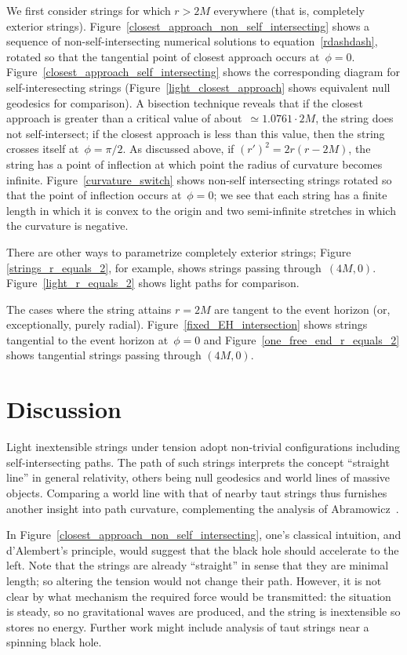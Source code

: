 We first consider strings for which $r>2M$ everywhere (that is,
completely exterior strings).
Figure~\ref{closest_approach_non_self_intersecting} shows a sequence
of non-self-intersecting numerical solutions to
equation~\ref{rdashdash}, rotated so that the tangential point of
closest approach occurs at~$\phi=0$.
Figure~\ref{closest_approach_self_intersecting} shows the
corresponding diagram for self-interesecting strings
(Figure~\ref{light_closest_approach} shows equivalent null geodesics
for comparison).  A bisection technique reveals that if the closest
approach is greater than a critical value of about~$\simeq 1.0761\cdot
2M$, the string does not self-intersect; if the closest approach is
less than this value, then the string crosses itself at~$\phi=\pi/2$.
As discussed above, if $\left(r'\right)^2=2r(r-2M)$, the string has a
point of inflection at which point the radius of curvature becomes
infinite.  Figure~\ref{curvature_switch} shows non-self intersecting
strings rotated so that the point of inflection occurs at~$\phi=0$; we
see that each string has a finite length in which it is convex to the
origin and two semi-infinite stretches in which the curvature is
negative.

There are other ways to parametrize completely exterior strings;
Figure \ref{strings_r_equals_2}, for example, shows strings passing
through~$(4M,0)$.  Figure~\ref{light_r_equals_2} shows light paths for
comparison.

The cases where the string attains $r=2M$ are tangent to the event
horizon (or, exceptionally, purely radial).
Figure~\ref{fixed_EH_intersection} shows strings tangential to the
event horizon at~$\phi=0$ and Figure~\ref{one_free_end_r_equals_2}
shows tangential strings passing through $(4M,0)$.

\section{Discussion}

Light inextensible strings under tension adopt non-trivial
configurations including self-intersecting paths.  The path of such
strings interprets the concept ``straight line'' in general
relativity, others being null geodesics and world lines of massive
objects.  Comparing a world line with that of nearby taut strings thus
furnishes another insight into path curvature, complementing the
analysis of Abramowicz~\cite{abramowicz1992}.

In Figure~\ref{closest_approach_non_self_intersecting}, one's
classical intuition, and d'Alembert's principle, would suggest that
the black hole should accelerate to the left.  Note that the strings
are already ``straight'' in sense that they are minimal length; so
altering the tension would not change their path.  However, it is not
clear by what mechanism the required force would be transmitted: the
situation is steady, so no gravitational waves are produced, and the
string is inextensible so stores no energy.  Further work might
include analysis of taut strings near a spinning black hole.

